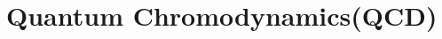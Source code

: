 \documentclass[10pt,show notes on second screen]{beamer}
\begin{document}
\section{Quantum Chromodynamics(QCD)}

\end{document}
